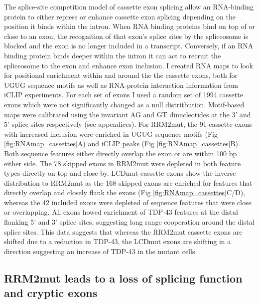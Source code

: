 The splice-site competition model of cassette exon splicing allow an RNA-binding protein to either repress or enhance cassette exon splicing depending on the position it binds within the intron. When RNA binding proteins bind on top of or close to an exon, the recognition of that exon's splice sites by the spliceosome is blocked and the exon is no longer included in a transcript. Conversely, if an RNA binding protein binds deeper within the intron it can act to recruit the spliceosome to the exon and enhance exon inclusion. 
I created RNA maps to look for positional enrichment within and around the the cassette exons, both for UGUG sequence motifs as well as RNA-protein interaction information from iCLIP experiments. For each set of exons I used a random set of 1994 cassette exons which were not significantly changed as a null distritbution.
Motif-based maps were calibrated using the invariant AG and GT dinucleotides at the 3' and 5' splice sites respectively (see appendices).
For RRM2mut, the 91 cassette exons with increased inclusion were enriched in UGUG sequence motifs (Fig \ref{fig:RNAmap_cassettes}A) and iCLIP peaks (Fig \ref{fig:RNAmap_cassettes}B).
Both sequence features either directly overlap the exon or are within 100 bp either side. 
The 78 skipped exons  in RRM2mut were depleted in both feature types directly on top and close by. 
LCDmut cassette exons show the inverse distribution to RRM2mut as the 168 skipped exons are enriched for features that directly overlap and closely flank the exons (Fig \ref{fig:RNAmap_cassettes}C/D), whereas the 42 included exons were depleted of sequence features that were close or overlapping.
All exons howed enrichment of TDP-43 features at the distal flanking 5' and 3' splice sites, suggesting long range cooperation around the distal splice sites.
This data suggests that whereas the RRM2mut cassette exons are shifted due to a reduction in TDP-43, the LCDmut exons are shifting in a direction suggesting an increase of TDP-43 in the mutant cells.



\subsection{RRM2mut leads to a loss of splicing function and cryptic exons}


